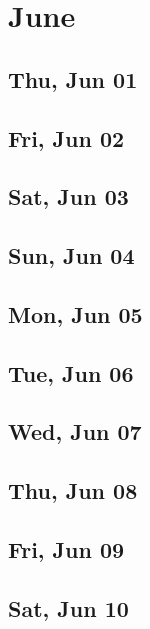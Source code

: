 \chapter{June}
	\section{Thu, Jun 01}
		
	\section{Fri, Jun 02}
		
	\section{Sat, Jun 03}
		
	\section{Sun, Jun 04}
		
	\section{Mon, Jun 05}
		
	\section{Tue, Jun 06}
		
	\section{Wed, Jun 07}
		
	\section{Thu, Jun 08}
		
	\section{Fri, Jun 09}
		
	\section{Sat, Jun 10}
		
